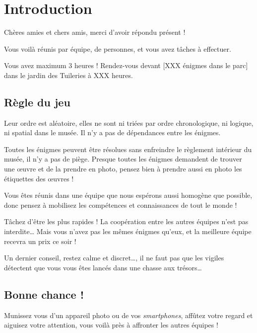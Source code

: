 \chapter{Introduction}

Chères amies et chers amis, merci d'avoir répondu présent !

Vous voilà réunis par équipe, de \nbparequipe{} personnes,
et vous avez \nbenigmes{} tâches à effectuer.

Vous avez maximum $3$ heures !
Rendez-vous devant [XXX énigmes dans le parc] dans le jardin des Tuileries à XXX heures.


\section*{Règle du jeu}

Leur ordre est aléatoire, elles ne sont ni triées par ordre chronologique, ni logique, ni spatial dans le musée. Il n'y a pas de dépendances entre les énigmes.

Toutes les énigmes peuvent être résolues sans enfreindre le règlement intérieur du musée, il n'y a pas de piège.
Presque toutes les énigmes demandent de trouver une œuvre et de la prendre en photo, pensez bien à prendre aussi en photo les étiquettes des œuvres !

Vous êtes réunis dans une équipe que nous espérons aussi homogène que possible, donc pensez à mobilisez les compétences et connaissances de tout le monde !

Tâchez d'être les plus rapides ! La coopération entre les autres équipes n'est pas interdite…
Mais vous n'avez pas les mêmes énigmes qu'eux, et la meilleure équipe recevra un prix ce soir !

Un dernier conseil, restez calme et discret…, il ne faut pas que les vigiles détectent que vous vous êtes lancés dans une chasse aux trésors…


\section*{Bonne chance !}
Munissez vous d'un appareil photo ou de vos \emph{smartphones}, affûtez votre regard et aiguisez votre attention, vous voilà près à affronter les autres équipes !
